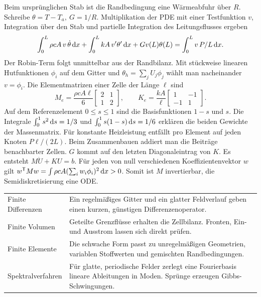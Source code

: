 Beim ursprünglichen Stab ist die Randbedingung eine Wärmeabfuhr über \(R\). Schreibe \(\theta=T-T_a,\ G=1/R\). Multiplikation der PDE mit einer Testfunktion \(v\), Integration über den Stab und partielle Integration des Leitungsflusses ergeben
\[
 \int_0^L \rho cA\,v\,\dot\theta\,\mathrm{d} x
 +\int_0^L kA\,v'\theta'\,\mathrm{d} x
 +Gv(L)\theta(L)=\int_0^L v\,P/L\,\mathrm{d} x .
\]
Der Robin-Term folgt unmittelbar aus der Randbilanz. Mit stückweise linearen Hutfunktionen \(\phi_i\) auf dem Gitter und \(\theta_h=\sum_j U_j\phi_j\) wählt man nacheinander \(v=\phi_i\). Die Elementmatrizen einer Zelle der Länge \(\ell\) sind
\[
 M_e=\frac{\rho cA\ell}{6}\begin{bmatrix}2&1\\1&2\end{bmatrix},\qquad
 K_e=\frac{kA}{\ell}\begin{bmatrix}1&-1\\-1&1\end{bmatrix}.
\]
Auf dem Referenzelement \(0\le s\le1\) sind die Basisfunktionen \(1-s\) und \(s\). Die Integrale \(\int_0^1 s^2\,\mathrm{d} s=1/3\) und \(\int_0^1 s(1-s)\,\mathrm{d} s=1/6\) erklären die beiden Gewichte der Massenmatrix. Für konstante Heizleistung entfällt pro Element auf jeden Knoten \(P\ell/(2L)\). Beim Zusammenbauen addiert man die Beiträge benachbarter Zellen. \(G\) kommt auf den letzten Diagonaleintrag von \(K\). Es entsteht \(M\dot U+KU=b\). Für jeden von null verschiedenen Koeffizientenvektor \(w\) gilt \(w^\mathsf TMw=\int\rho c A(\sum_iw_i\phi_i)^2\,\mathrm{d} x>0\). Somit ist \(M\) invertierbar, die Semidiskretisierung eine ODE.
{\tblstart\begin{tabularx}{\linewidth}{@{}P{26mm}Y@{}}\toprule
{}&\\\midrule
Finite Differenzen&Ein regelmäßiges Gitter und ein glatter Feldverlauf geben einen kurzen, günstigen Differenzenoperator.\\
Finite Volumen&Geteilte Grenzflüsse erhalten die Zellbilanz. Fronten, Ein- und Ausstrom lassen sich direkt prüfen.\\
Finite Elemente&Die schwache Form passt zu unregelmäßigen Geometrien, variablen Stoffwerten und gemischten Randbedingungen.\\
Spektralverfahren&Für glatte, periodische Felder zerlegt eine Fourierbasis lineare Ableitungen in Moden. Sprünge erzeugen Gibbs-Schwingungen.\\\bottomrule
\end{tabularx}\par}

